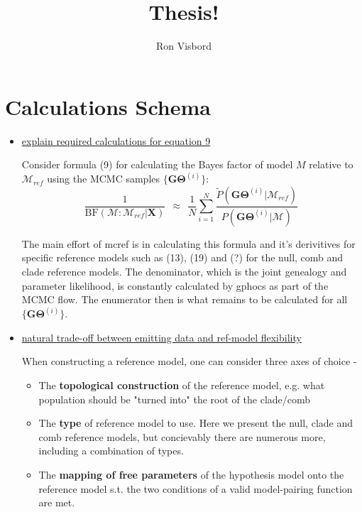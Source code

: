 \documentclass[11pt]{article}
\author{Ron Visbord}
\title{Thesis!}
\newcommand{\vect}[1]{\boldsymbol{\mathbf{#1}}}
\newcommand{\X}{\vect{X}}
\newcommand{\M}{\mathcal{M}}
\newcommand{\G}{\vect{G}}
\newcommand{\T}{\vect{\Theta}}
\newcommand{\GT}{\G\T}
\newcommand{\Mref}{\M_{ref}}
\newcommand{\Pref}{\widetilde{P}}
\newcommand{\rbf}{\text{BF}}
\begin{document}
\maketitle


\section{Calculations Schema}

\begin{itemize}


\item \underline{explain required calculations for equation 9}

Consider formula (9) for calculating the Bayes factor of model $M$ relative to $\Mref$ using the MCMC samples $\{\GT^{(i)}\}$:
%
%
\begin{equation}\label{eq:rbf}
 \frac{1}{\rbf(\M:\Mref|\X)}  ~~\approx~~ \frac{1}{N} \sum_{i=1}^{N}\frac{\Pref(\GT^{(i)}|\Mref) }{P(\GT^{(i)}|\M)} ~ 
\end{equation}

The main effort of mcref is in calculating this formula and it's derivitives for specific reference models such as (13), (19) and (?) for the null, comb and clade reference models.
The denominator, which is the joint genealogy and parameter likelihood, is constantly calculated by gphocs as part of the MCMC flow. The enumerator then is what remains to be calculated for all $\{\GT^{(i)}\}$. 
	
\item \underline{natural trade-off between emitting data and ref-model flexibility}

When constructing a reference model, one can consider three axes of choice - 
\begin{itemize}
\item The \textbf{topological construction} of the reference model, e.g. what population should be "turned into" the root of the clade/comb

\item The \textbf{type} of reference model to use. Here we present the null, clade and comb reference models, but concievably there are numerous more, including a combination of types.

\item The \textbf{mapping of free parameters} of the hypothesis model onto the reference model s.t. the two conditions of a valid model-pairing function are met.
\end{itemize}


\end{itemize}
\end{document}
